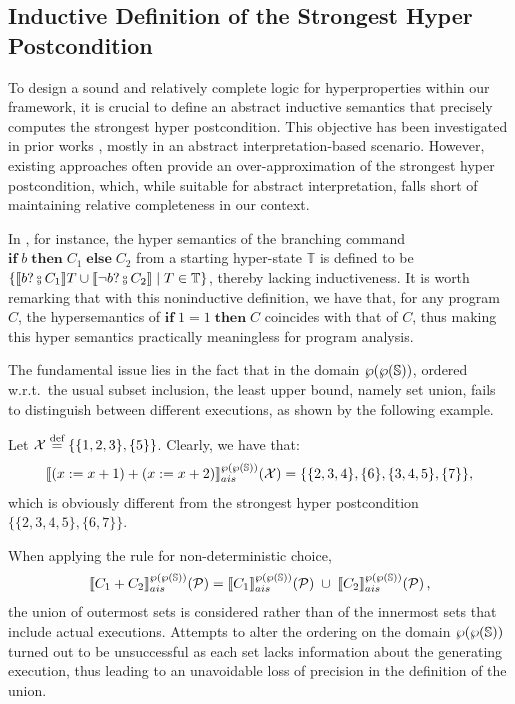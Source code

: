 \documentclass[
  10pt,       %
  twoside,    %
  a4paper,    %
  english,    %
  tikz,       %
  openright,  %
]{book}
\begin{document}
\subsection{Inductive Definition of the Strongest Hyper Postcondition}

To design a sound and relatively complete logic for hyperproperties within
our framework, it is crucial to define an abstract inductive semantics that
precisely computes the strongest hyper postcondition. This objective has been
investigated in prior works \cite{Mounir17, Mastroeni18}, mostly in an 
abstract interpretation-based scenario. However, existing approaches often provide an
over-approximation of the strongest hyper postcondition, which, while suitable
for abstract interpretation, falls short of maintaining relative completeness
in our context.

In \cite{Mounir17}, for instance, the hyper semantics of the branching command 
$\mathbf{if} \; b \; \mathbf{then} \; C_1 \; \mathbf{else} \; C_2$ from 
a starting hyper-state $\mathbb{T}$ is defined to be $\{ \sem{b ? \fcmp C_1} T
\cup \sem{\neg b ? \fcmp C_2} \mid T \in \mathbb{T}\}$, thereby lacking
inductiveness. It is worth remarking that with this noninductive definition, we have that, 
for any program $C$,
the hypersemantics of  
$\mathbf{if} \; 1 = 1 \; \mathbf{then} \; C$ coincides with that of $C$, thus making this
hyper semantics practically meaningless for program analysis.

The fundamental issue lies in the fact that in the domain $\pow{\pow{\states}}$, ordered w.r.t.\ 
the usual subset inclusion, the least upper bound, namely set union, fails to distinguish between different
executions, as shown by the following example.

\begin{example}
  \label{exmp:determinism}
  Let $\mathcal{X} \defeq \{\{1, 2, 3\}, \{5\}\}$. Clearly, we have that:
  $$\asem[\pow{\pow{\states}}]{(x := x + 1) + (x := x + 2)}(\mathcal{X}) = 
  \{\{2, 3, 4\}, \{6\}, \{3, 4, 5\}, \{7\}\},$$
  which is obviously different from the strongest hyper postcondition 
  $\{\{2, 3, 4, 5\}, \{6, 7\}\}$.
\end{example}

When applying the rule for non-deterministic choice,
\begin{align*}
\asem[\pow{\pow{\states}}]{C_1 + C_2}(\mathcal{P}) =
\asem[\pow{\pow{\states}}]{C_1}(\mathcal{P}) \;\cup\;
\asem[\pow{\pow{\states}}]{C_2}(\mathcal{P})\, ,
\end{align*}
the union of outermost sets is
considered rather than of the innermost sets that include actual executions. Attempts to
alter the ordering on the domain $\pow{\pow{\states}}$ turned out to be unsuccessful 
as each set lacks information about the generating execution, thus leading to an unavoidable loss
of precision in the definition of the union. 
\end{document}
